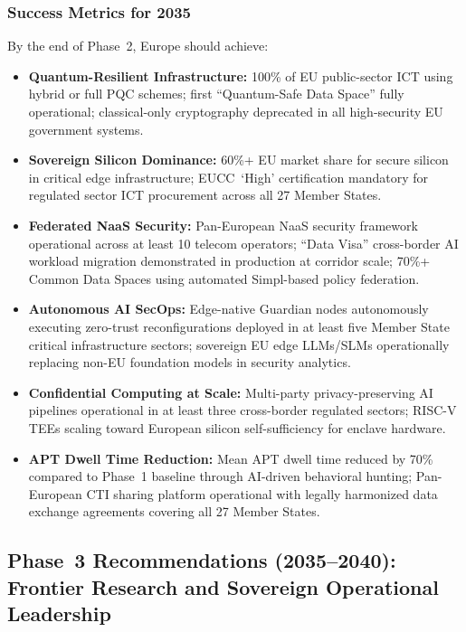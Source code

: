 \subsubsection*{Success Metrics for 2035}
By the end of Phase~2, Europe should achieve:
\begin{itemize}
    \item \textbf{Quantum-Resilient Infrastructure:}
    100\% of EU public-sector ICT using hybrid or full PQC schemes;
    first ``Quantum-Safe Data Space'' fully operational;
    classical-only cryptography deprecated in all high-security EU
    government systems.

    \item \textbf{Sovereign Silicon Dominance:}
    60\%+ EU market share for secure silicon in critical edge
    infrastructure; EUCC~`High' certification mandatory for regulated
    sector ICT procurement across all 27 Member States.

    \item \textbf{Federated NaaS Security:}
    Pan-European NaaS security framework operational across at least
    10 telecom operators; ``Data Visa'' cross-border AI workload
    migration demonstrated in production at corridor scale; 70\%+
    Common Data Spaces using automated Simpl-based policy federation.

    \item \textbf{Autonomous AI SecOps:}
    Edge-native Guardian nodes autonomously executing zero-trust
    reconfigurations deployed in at least five Member State critical
    infrastructure sectors; sovereign EU edge LLMs/SLMs operationally
    replacing non-EU foundation models in security analytics.

    \item \textbf{Confidential Computing at Scale:}
    Multi-party privacy-preserving AI pipelines operational in at
    least three cross-border regulated sectors; RISC-V TEEs scaling
    toward European silicon self-sufficiency for enclave hardware.

    \item \textbf{APT Dwell Time Reduction:}
    Mean APT dwell time reduced by 70\% compared to Phase~1 baseline
    through AI-driven behavioral hunting; Pan-European CTI sharing
    platform operational with legally harmonized data exchange
    agreements covering all 27 Member States.
\end{itemize}

\subsection*{Phase~3 Recommendations (2035--2040):
             Frontier Research and Sovereign Operational Leadership}

